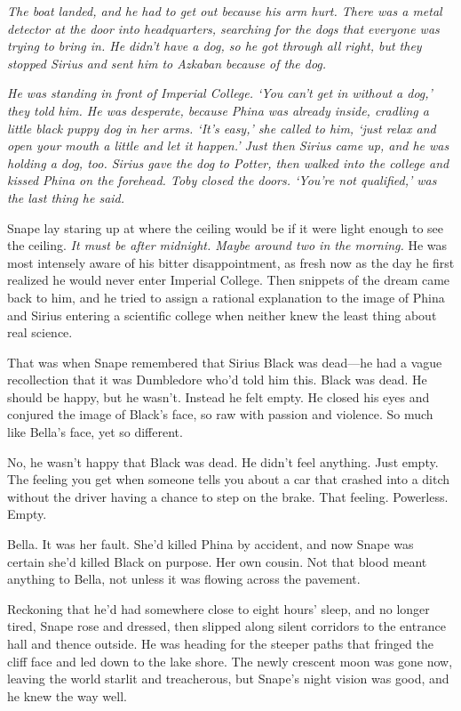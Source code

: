 \emph{The boat landed, and he had to get out because his arm hurt. There was a metal detector at the door into headquarters, searching for the dogs that everyone was trying to bring in. He didn't have a dog, so he got through all right, but they stopped Sirius and sent him to Azkaban because of the dog.}

\emph{He was standing in front of Imperial College. `You can't get in without a dog,' they told him. He was desperate, because Phina was already inside, cradling a little black puppy dog in her arms. `It's easy,' she called to him, `just relax and open your mouth a little and let it happen.' Just then Sirius came up, and he was holding a dog, too. Sirius gave the dog to Potter, then walked into the college and kissed Phina on the forehead. Toby closed the doors. `You're not qualified,' was the last thing he said.}

Snape lay staring up at where the ceiling would be if it were light enough to see the ceiling. \emph{It must be after midnight. Maybe around two in the morning.} He was most intensely aware of his bitter disappointment, as fresh now as the day he first realized he would never enter Imperial College. Then snippets of the dream came back to him, and he tried to assign a rational explanation to the image of Phina and Sirius entering a scientific college when neither knew the least thing about real science.

That was when Snape remembered that Sirius Black was dead—he had a vague recollection that it was Dumbledore who'd told him this. Black was dead. He should be happy, but he wasn't. Instead he felt empty. He closed his eyes and conjured the image of Black's face, so raw with passion and violence. So much like Bella's face, yet so different.

No, he wasn't happy that Black was dead. He didn't feel anything. Just empty. The feeling you get when someone tells you about a car that crashed into a ditch without the driver having a chance to step on the brake. That feeling. Powerless. Empty.

Bella. It was her fault. She'd killed Phina by accident, and now Snape was certain she'd killed Black on purpose. Her own cousin. Not that blood meant anything to Bella, not unless it was flowing across the pavement.

Reckoning that he'd had somewhere close to eight hours' sleep, and no longer tired, Snape rose and dressed, then slipped along silent corridors to the entrance hall and thence outside. He was heading for the steeper paths that fringed the cliff face and led down to the lake shore. The newly crescent moon was gone now, leaving the world starlit and treacherous, but Snape's night vision was good, and he knew the way well.

